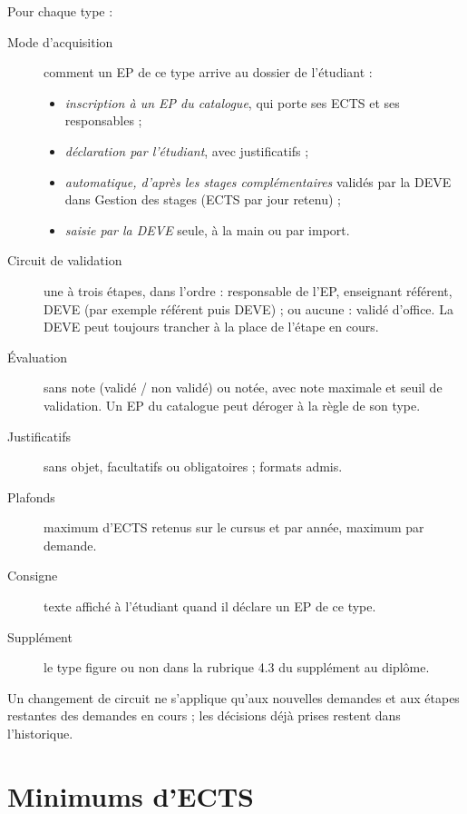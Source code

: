 \documentclass[11pt,a4paper]{article}
\begin{document}
Pour chaque type :
\begin{description}
  \item[Mode d'acquisition] comment un EP de ce type arrive au dossier de l'étudiant :
    \begin{itemize}
      \item \emph{inscription à un EP du catalogue}, qui porte ses ECTS et ses responsables ;
      \item \emph{déclaration par l'étudiant}, avec justificatifs ;
      \item \emph{automatique, d'après les stages complémentaires} validés par la DEVE dans
        \og Gestion des stages\fg{} (ECTS par jour retenu) ;
      \item \emph{saisie par la DEVE} seule, à la main ou par import.
    \end{itemize}
  \item[Circuit de validation] une à trois étapes, dans l'ordre : responsable de l'EP,
    enseignant référent, DEVE (par exemple \og référent puis DEVE\fg{}) ; ou \og aucune\fg{} :
    validé d'office. La DEVE peut toujours trancher à la place de l'étape en cours.
  \item[Évaluation] sans note (validé / non validé) ou notée, avec note maximale et seuil de
    validation. Un EP du catalogue peut déroger à la règle de son type.
  \item[Justificatifs] sans objet, facultatifs ou obligatoires ; formats admis.
  \item[Plafonds] maximum d'ECTS retenus sur le cursus et par année, maximum par demande.
  \item[Consigne] texte affiché à l'étudiant quand il déclare un EP de ce type.
  \item[Supplément] le type figure ou non dans la rubrique 4.3 du supplément au diplôme.
\end{description}


\begin{astuce}
Un changement de circuit ne s'applique qu'aux nouvelles demandes et aux étapes restantes des
demandes en cours ; les décisions déjà prises restent dans l'historique.
\end{astuce}

\section{Minimums d'ECTS}\label{sec:minimums}
\end{document}
